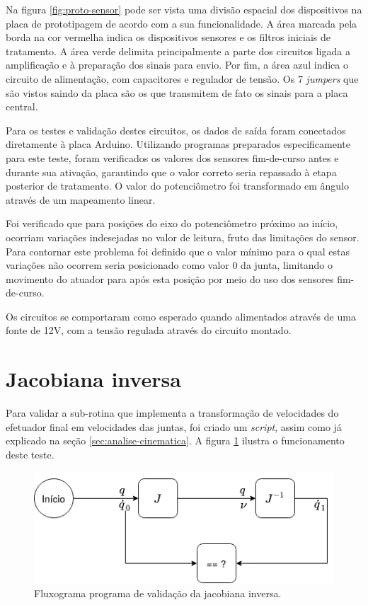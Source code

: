 Na figura \ref{fig:proto-sensor} pode ser vista uma divisão espacial dos dispositivos
na placa de prototipagem de acordo com a sua funcionalidade. A área marcada pela
borda na cor vermelha indica os dispositivos sensores e os filtros iniciais de tratamento.
A área verde delimita principalmente a parte dos circuitos ligada a amplificação e à
preparação dos sinais para envio. Por fim, a área azul indica o circuito de alimentação,
com capacitores e regulador de tensão. Os 7 \textit{jumpers} que são vistos saindo da
placa são os que transmitem de fato os sinais para a placa central.

Para os testes e validação destes circuitos, os dados de saída foram conectados
diretamente à placa Arduino. Utilizando programas preparados especificamente para
este teste, foram verificados os valores dos sensores fim-de-curso antes e durante
sua ativação, garantindo que o valor correto seria repassado à etapa posterior
de tratamento. O valor do potenciômetro foi transformado em ângulo através de um
mapeamento linear. 

Foi verificado que para posições do eixo do potenciômetro próximo ao início, 
ocorriam variações indesejadas no valor de leitura, fruto das limitações do sensor.
Para contornar este problema foi definido que o valor mínimo para o qual estas 
variações não ocorrem seria posicionado como valor 0 da junta, limitando o movimento
do atuador para após esta posição por meio do uso dos sensores fim-de-curso.

Os circuitos se comportaram como esperado quando alimentados através de uma fonte de 
12V, com a tensão regulada através do circuito montado.

\section{Jacobiana inversa}

Para validar a sub-rotina que implementa a transformação de velocidades do efetuador final
em velocidades das juntas, foi criado um \textit{script}, assim como já explicado na seção
\ref{sec:analise-cinematica}. A figura \ref{fig:test-vel} ilustra o funcionamento deste teste.

\begin{figure}[ht]
    \caption{Fluxograma programa de validação da jacobiana inversa.}

    \begin{centering}
        \includegraphics[width=0.6\columnwidth]{images/resultados/Test-vel.png} 
    \par\end{centering}

    \label{fig:test-vel}
\end{figure}

